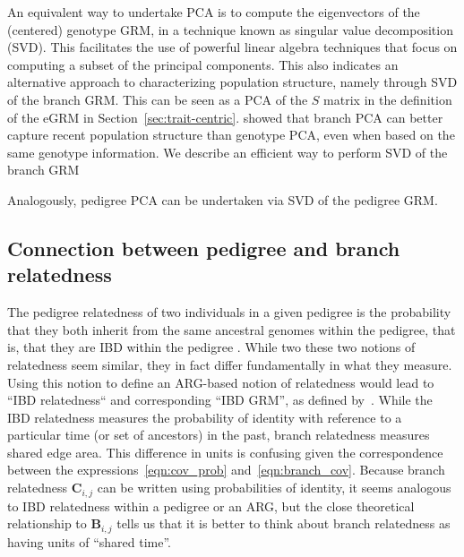 An equivalent way to undertake PCA is to compute the eigenvectors of the (centered) genotype GRM, in a technique known as singular value decomposition (SVD). This facilitates the use of powerful linear algebra techniques that focus on computing a subset of the principal components. This also indicates an alternative approach to characterizing population structure, namely through SVD of the branch GRM. This can be seen as a PCA of the $S$ matrix in the definition of the eGRM in Section~\ref{sec:trait-centric}. \cite{fan2022genealogical} showed that branch PCA can better capture recent population structure than genotype PCA, even when based on the same genotype information. We describe an efficient way to perform SVD of the branch GRM 

Analogously, pedigree PCA can be undertaken via SVD of the pedigree GRM. 

\subsection{Connection between pedigree and branch relatedness}
The pedigree relatedness of two individuals in a given pedigree is
the probability that they both inherit from the same ancestral genomes within the pedigree,
that is, that they are IBD within the pedigree \citep{malecot1969mathemathics}.
While two these two notions of relatedness seem similar,
they in fact differ fundamentally in what they measure.
%
Using this notion to define an ARG-based notion of relatedness would lead to ``IBD relatedness``
and corresponding ``IBD GRM'',
as defined by~\citet{tsambos2022efficient}.
%
While the IBD relatedness measures the
probability of identity with reference to a particular time (or set of ancestors) in the past,
branch relatedness measures shared edge area.
%
This difference in units is confusing given the correspondence between
the expressions~\eqref{eqn:cov_prob} and~\eqref{eqn:branch_cov}.
%
Because branch relatedness $\mathbf{C}_{i,j}$ can be written using probabilities of identity,
it seems analogous to IBD relatedness within a pedigree or an ARG,
but the close theoretical relationship to $\mathbf{B}_{i,j}$
tells us that it is better to think about branch relatedness as having units of ``shared time''.


